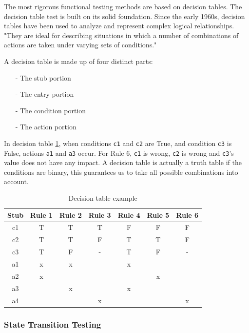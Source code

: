 The most rigorous functional testing methods are based on decision tables. The decision table test is built on its solid foundation. Since the early 1960s, decision tables have been used to analyze and represent complex logical relationships. "They are ideal for describing situations in which a number of combinations of actions are taken under varying sets of conditions." \cite{jorgensen_decision_2014}

 
A decision table is made up of four distinct parts:
\begin{itemize}
  \item[-] The stub portion
  \item[-] The entry portion
  \item[-] The condition portion
  \item[-] The action portion
\end{itemize}

In decision table \ref{tab:Decision table example}, when conditions \texttt{c1} and \texttt{c2} are True, and condition \texttt{c3} is False, actions \texttt{a1} and \texttt{a3} occur. For Rule 6, \texttt{c1} is wrong, \texttt{c2} is wrong and \texttt{c3}'s value does not have any impact.
A decision table is actually a truth table if the conditions are binary, this guarantees us to take all possible combinations into account.

\begin{table}[ht]
\centering
\begin{tabular}{ |c|c|c|c|c|c|c| } 
\hline
Stub & Rule 1 & Rule 2 & Rule 3 & Rule 4 & Rule 5 & Rule 6 \\
\hline
\hline
\rowcolor{Gray}
c1 & T & T & T & F & F & F \\
\hline
c2 & T & T & F & T & T & F \\
\hline
\rowcolor{Gray}
c3 & T & F & - & T & F & - \\ 
\hline
\hline
a1 & x & x &  & x & &  \\
\hline
\rowcolor{Gray}
a2 & x & & & & x &   \\
\hline
a3 &  & x & & x & &  \\
\hline
\rowcolor{Gray}
a4 &  &  & x & &  & x  \\ 
\hline
\end{tabular}
\caption{Decision table example}
\label{tab:Decision table example}
\end{table}


\subsubsection{State Transition Testing}

